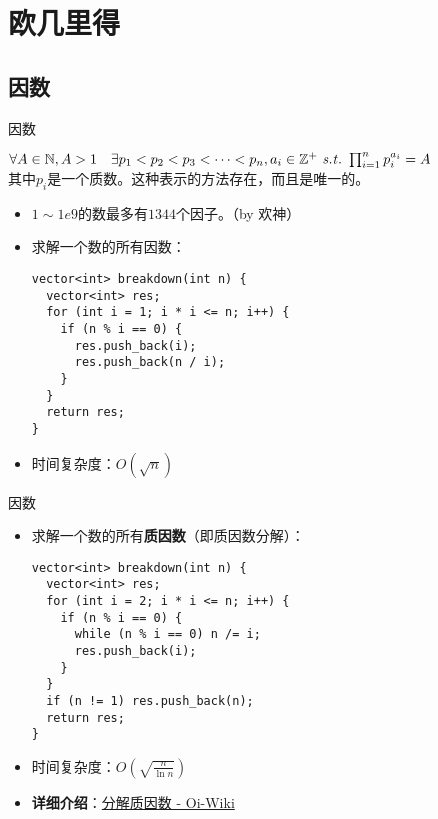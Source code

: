 \section{欧几里得}
\subsection{因数}
\begin{frame}[fragile]{因数}
  \begin{theorem}[算术基本定理]
    $\forall A\in \mathbb{N},A>1 \quad \exists p_1<p_2<p_3<\cdots<p_n,a_i\in \mathbb{Z}^+ \  \mathit{s.t.}\  \prod_{i=1}^n p_i^{a_i}=A$\\
    其中$p_i$是一个质数。这种表示的方法存在，而且是唯一的。
  \end{theorem}
  \pause 
  \begin{itemize}
    \item $1\sim 1e9$的数最多有$1344$个因子。（by 欢神）
    \pause
    \item 求解一个数的所有因数：
    \begin{lstlisting}
vector<int> breakdown(int n) {
  vector<int> res;
  for (int i = 1; i * i <= n; i++) {
    if (n % i == 0) {
      res.push_back(i);
      res.push_back(n / i);
    }
  }
  return res;
}
    \end{lstlisting}
    \item 时间复杂度：$O(\sqrt{n})$
  \end{itemize}
\end{frame}

\begin{frame}[fragile]{因数}
  \begin{itemize}
    \item 求解一个数的所有\textbf{质因数}（即质因数分解）：
    \pause
    \begin{lstlisting}
vector<int> breakdown(int n) {
  vector<int> res;
  for (int i = 2; i * i <= n; i++) {
    if (n % i == 0) {
      while (n % i == 0) n /= i;
      res.push_back(i);
    }
  }
  if (n != 1) res.push_back(n);
  return res;
}
    \end{lstlisting}
    \item 时间复杂度：$O(\sqrt{\frac{n}{\ln{n}}})$
    \pause
    \item \textbf{详细介绍}：\href{https://oi-wiki.org/math/pollard-rho/}{分解质因数 - Oi-Wiki} 
  \end{itemize}
\end{frame}


